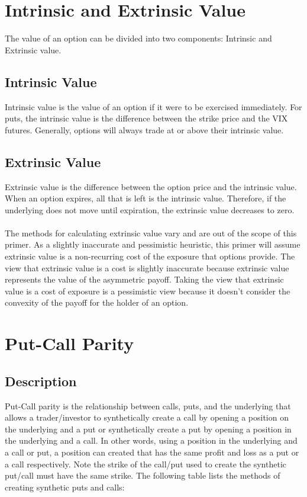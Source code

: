 \documentclass[11pt, oneside]{book}
\begin{document}
\section{Intrinsic and Extrinsic Value} \label{Options-IVEV}
The value of an option can be divided into two components: Intrinsic and Extrinsic value. 

\subsection{Intrinsic Value} \label{Options-IVEV-Intrinsic}
Intrinsic value is the value of an option if it were to be exercised immediately. For puts, the intrinsic value is the difference between the strike price and the VIX futures. Generally, options will always trade at or above their intrinsic value.

\subsection{Extrinsic Value} \label{Options-IVEV-Extrinsic}
Extrinsic value is the difference between the option price and the intrinsic value. When an option expires, all that is left is the intrinsic value. Therefore, if the underlying does not move until expiration, the extrinsic value decreases to zero. \\
\\
The methods for calculating extrinsic value vary and are out of the scope of this primer. As a slightly inaccurate and pessimistic heuristic, this primer will assume extrinsic value is a non-recurring cost of the exposure that options provide. The view that extrinsic value is a cost is slightly inaccurate because extrinsic value represents the value of the asymmetric payoff. Taking the view that extrinsic value is a cost of exposure is a pessimistic view because it doesn't consider the convexity of the payoff for the holder of an option.

\section{Put-Call Parity} \label{Options-PutCall}
\subsection{Description} \label{Options-PutCall-Description}
Put-Call parity is the relationship between calls, puts, and the underlying that allows a trader/investor to synthetically create a call by opening a position on the underlying and a put or synthetically create a put by opening a position in the underlying and a call. In other words, using a position in the underlying and a call or put, a position can created that has the same profit and loss as a put or a call respectively. Note the strike of the call/put used to create the synthetic put/call must have the same strike. The following table lists the methods of creating synthetic puts and calls:
\end{document}
